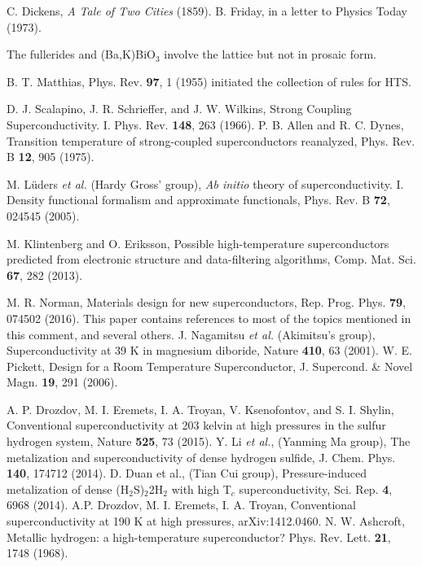 \documentclass[aps,prb,twocolumn,groupedaddress]{revtex4}
\begin{document}
\begin{thebibliography}{99}

 C. Dickens, {\it A Tale of Two Cities} (1859). 
 B. Friday, in a letter to Physics Today (1973).

 The fullerides and (Ba,K)BiO$_3$ involve the lattice
  but not in prosaic form.

B. T. Matthias, Phys. Rev. {\bf 97}, 1 (1955) initiated
the collection of rules for HTS.

D. J. Scalapino, J. R. Schrieffer, and J. W. Wilkins,
  Strong Coupling Superconductivity. I.
  Phys. Rev. {\bf 148}, 263 (1966).
P. B. Allen and R. C. Dynes,
Transition temperature of strong-coupled superconductors reanalyzed,
Phys. Rev. B {\bf 12}, 905 (1975).

 M. L\"uders {\it et al.} (Hardy Gross' group), 
{\it Ab initio} theory of superconductivity. I. Density functional formalism 
  and approximate functionals,
  Phys. Rev. B {\bf 72}, 024545 (2005).

 M. Klintenberg and O. Eriksson,
 Possible high-temperature superconductors predicted from electronic
 structure and data-filtering algorithms,
 Comp. Mat. Sci. {\bf 67}, 282 (2013).

 M. R. Norman, 
   Materials design for new superconductors, 
  Rep. Prog. Phys. {\bf 79}, 074502 (2016). This paper contains references 
  to most of the topics mentioned in this comment, and several others.
J. Nagamitsu {\it et al.} (Akimitsu's group), 
 Superconductivity at 39 K in magnesium diboride,
 Nature {\bf 410}, 63 (2001).
 W. E. Pickett,
 Design for a Room Temperature Superconductor,
 J. Supercond. \& Novel Magn. {\bf 19}, 291 (2006).



 A. P. Drozdov, M. I. Eremets, I. A. Troyan, 
  V. Ksenofontov, and S. I. Shylin, 
  Conventional superconductivity at 203 kelvin at high pressures 
  in the sulfur hydrogen system, Nature {\bf 525}, 73 (2015). 
 Y. Li {\it et al.}, (Yanming Ma group), 
  The metalization and superconductivity of dense hydrogen sulfide, 
  J. Chem. Phys. {\bf 140}, 174712 (2014).
 D. Duan et al., (Tian Cui group), 
  Pressure-induced metalization of dense (H$_2$S)$_2$2H$_2$ with high T$_c$ 
    superconductivity, Sci. Rep. {\bf 4}, 6968 (2014).
A.P. Drozdov, M. I. Eremets, I. A. Troyan,
  Conventional superconductivity at 190 K at high pressures,
 arXiv:1412.0460.
 N. W. Ashcroft,
  Metallic hydrogen: a high-temperature superconductor?
 Phys. Rev. Lett. {\bf 21}, 1748 (1968).


\end{thebibliography}
\end{document}
